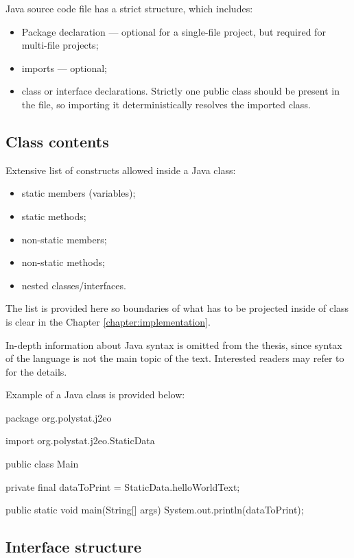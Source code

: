 Java source code file has a strict structure, which includes:
\begin{itemize}
    \item Package declaration --- optional for a single-file project, but required for multi-file projects;
    \item imports --- optional;
    \item class or interface declarations. Strictly one public class
        should be present in the file, so importing it deterministically
        resolves the imported class.
\end{itemize}

\subsection{Class contents}

Extensive list of constructs allowed inside a Java class:
\begin{itemize}
    \item static members (variables);
    \item static methods;
    \item non-static members;
    \item non-static methods;
    \item nested classes/interfaces.
\end{itemize}
The list is provided here so boundaries of what has to be projected inside of class is clear in the Chapter \ref{chapter:implementation}.

In-depth information about Java syntax is omitted from the thesis, since syntax of the language is not the main topic of the text. Interested readers may refer to \cite{java_specification} for the details.

Example of a Java class is provided below:

\begin{ffcode}
package org.polystat.j2eo

import org.polystat.j2eo.StaticData

public class Main {
    private final dataToPrint = StaticData.helloWorldText;

    public static void main(String[] args) {
        System.out.println(dataToPrint);
    }
}
\end{ffcode}


\subsection{Interface structure}


